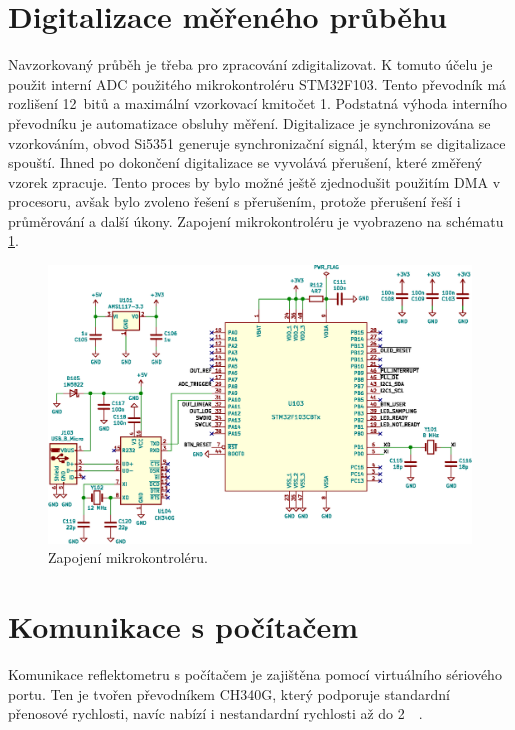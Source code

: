 \section{Digitalizace měřeného průběhu}
Navzorkovaný průběh je třeba pro zpracování zdigitalizovat. K tomuto účelu je použit interní \acrshort{ADC} použitého mikrokontroléru STM32F103. Tento převodník má rozlišení 12~bitů a maximální vzorkovací kmitočet \SI{1}{\megasample}. Podstatná výhoda interního převodníku je automatizace obsluhy měření. Digitalizace je synchronizována se vzorkováním, obvod Si5351 generuje synchronizační signál, kterým se digitalizace spouští. Ihned po dokončení digitalizace se vyvolává přerušení, které změřený vzorek zpracuje. Tento proces by bylo možné ještě zjednodušit použitím DMA v procesoru, avšak bylo zvoleno řešení s přerušením, protože přerušení řeší i průměrování a další úkony. Zapojení mikrokontroléru je vyobrazeno na schématu \ref{microcontroller_section}.

\begin{figure}[htbp]
\includegraphics[width=\textwidth,keepaspectratio]{images/microcontroller_section.eps}\caption{Zapojení mikrokontroléru.}\label{microcontroller_section}
\end{figure}

\section{Komunikace s počítačem}
Komunikace reflektometru s počítačem je zajištěna pomocí virtuálního sériového portu. Ten je tvořen převodníkem CH340G, který podporuje standardní přenosové rychlosti, navíc nabízí i nestandardní rychlosti až do \SI{2}{\mega\baud}.